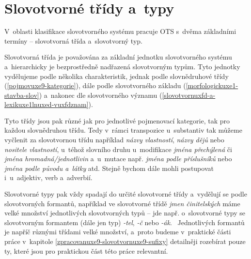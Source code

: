 \hypertarget{slovotvornuxe9-tux159uxeddy-a-typy}{%
\section{Slovotvorné třídy
a~typy}\label{slovotvornuxe9-tux159uxeddy-a-typy}}

V~oblasti klasifikace slovotvorného systému pracuje OTS s~dvěma
základními termíny -- slovotvorná třída a~slovotvorný typ.

Slovotvorná třída je považována za základní jednotku slovotvorného
systému a~hierarchicky je bezprostředně nadřazená slovotvorným typům.
Tyto jednotky vydělujeme podle několika charakteristik, jednak podle
slovnědruhové třídy (\ref{pojmovuxe9-kategorie}), dále podle
slovotvorného základu (\ref{morfologickuxe1-stavba-slov}) a~nakonec dle
slovotvorného významu
(\ref{slovotvornuxfd-a-lexikuxe1lnuxed-vuxfdznam}).
\parencite[107]{dokulil00}

Tyto třídy jsou pak různé jak pro jednotlivé pojmenovací kategorie, tak
pro každou slovnědruhou třídu. Tedy v~rámci transpozice u~substantiv tak
můžeme vyčlenit za slovotvornou třídu například \emph{názvy vlastností},
\emph{názvy dějů} nebo \emph{nositele vlastností}, u~téhož slovního
druhu u~modifikace \emph{jména přechýlená} či \emph{jména
hromadná/jednotlivin} a~u~mutace např. \emph{jména podle příslušníků}
nebo \emph{jména podle původu a~látky} atd. Stejně bychom dále mohli
postupovat i~u~adjektiv, verb a~adverbií.

Slovotvorné typy pak vždy spadají do určité slovotvorné třídy a~vydělují
se podle slovotvorných formantů, například ve slovotvorné třídě
\emph{jmen činitelských} máme velké množství jednotlivých slovotvorných
typů -- jde např. o~slovotvorné typy se slovotvorným formantem (dále jen
typ) \emph{-tel}, \emph{-č} nebo \emph{-ák}.~\parencite[108]{dokulil00}
Jednotlivých formantů je napříč různými třídami velké množství, a~proto
budeme v~praktické části práce v~kapitole
\ref{zpracovanuxe9-slovotvornuxe9-sufixy} detailněji rozebírat pouze ty,
které jsou pro praktickou část této práce relevantní.

